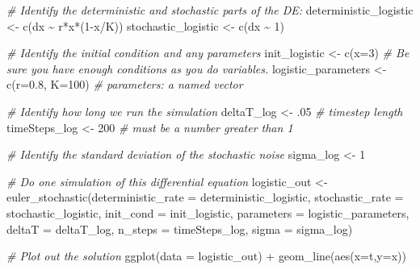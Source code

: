 \documentclass[
]{book}
\newenvironment{Shaded}{\begin{snugshade}}{\end{snugshade}}
\newcommand{\AttributeTok}[1]{\textcolor[rgb]{0.77,0.63,0.00}{#1}}
\newcommand{\CommentTok}[1]{\textcolor[rgb]{0.56,0.35,0.01}{\textit{#1}}}
\newcommand{\DecValTok}[1]{\textcolor[rgb]{0.00,0.00,0.81}{#1}}
\newcommand{\FloatTok}[1]{\textcolor[rgb]{0.00,0.00,0.81}{#1}}
\newcommand{\FunctionTok}[1]{\textcolor[rgb]{0.00,0.00,0.00}{#1}}
\newcommand{\NormalTok}[1]{#1}
\newcommand{\OtherTok}[1]{\textcolor[rgb]{0.56,0.35,0.01}{#1}}
\newcommand{\SpecialCharTok}[1]{\textcolor[rgb]{0.00,0.00,0.00}{#1}}
\theoremstyle{definition}
\theoremstyle{definition}
\theoremstyle{definition}
\theoremstyle{remark}
\begin{document}
\begin{Shaded}
\begin{Highlighting}[]
\CommentTok{\# Identify the deterministic and stochastic parts of the DE:}
\NormalTok{deterministic\_logistic }\OtherTok{\textless{}{-}} \FunctionTok{c}\NormalTok{(dx }\SpecialCharTok{\textasciitilde{}}\NormalTok{ r}\SpecialCharTok{*}\NormalTok{x}\SpecialCharTok{*}\NormalTok{(}\DecValTok{1}\SpecialCharTok{{-}}\NormalTok{x}\SpecialCharTok{/}\NormalTok{K))}
\NormalTok{stochastic\_logistic }\OtherTok{\textless{}{-}}  \FunctionTok{c}\NormalTok{(dx }\SpecialCharTok{\textasciitilde{}} \DecValTok{1}\NormalTok{)}

\CommentTok{\# Identify the initial condition and any parameters}
\NormalTok{init\_logistic }\OtherTok{\textless{}{-}} \FunctionTok{c}\NormalTok{(}\AttributeTok{x=}\DecValTok{3}\NormalTok{)  }\CommentTok{\# Be sure you have enough conditions as you do variables. }
\NormalTok{logistic\_parameters }\OtherTok{\textless{}{-}} \FunctionTok{c}\NormalTok{(}\AttributeTok{r=}\FloatTok{0.8}\NormalTok{, }\AttributeTok{K=}\DecValTok{100}\NormalTok{)   }\CommentTok{\# parameters: a named vector}

\CommentTok{\# Identify how long we run the simulation}
\NormalTok{deltaT\_log }\OtherTok{\textless{}{-}}\NormalTok{ .}\DecValTok{05}    \CommentTok{\# timestep length}
\NormalTok{timeSteps\_log }\OtherTok{\textless{}{-}} \DecValTok{200}   \CommentTok{\# must be a number greater than 1}

\CommentTok{\# Identify the standard deviation of the stochastic noise}
\NormalTok{sigma\_log }\OtherTok{\textless{}{-}} \DecValTok{1}

\CommentTok{\# Do one simulation of this differential equation}
\NormalTok{logistic\_out }\OtherTok{\textless{}{-}} \FunctionTok{euler\_stochastic}\NormalTok{(}\AttributeTok{deterministic\_rate =}\NormalTok{ deterministic\_logistic,}
                             \AttributeTok{stochastic\_rate =}\NormalTok{ stochastic\_logistic,}
                             \AttributeTok{init\_cond =}\NormalTok{ init\_logistic,}
                             \AttributeTok{parameters =}\NormalTok{ logistic\_parameters,}
                             \AttributeTok{deltaT =}\NormalTok{ deltaT\_log,}
                             \AttributeTok{n\_steps =}\NormalTok{ timeSteps\_log,}
                             \AttributeTok{sigma =}\NormalTok{ sigma\_log)}

\CommentTok{\# Plot out the solution}
\FunctionTok{ggplot}\NormalTok{(}\AttributeTok{data =}\NormalTok{ logistic\_out) }\SpecialCharTok{+}
  \FunctionTok{geom\_line}\NormalTok{(}\FunctionTok{aes}\NormalTok{(}\AttributeTok{x=}\NormalTok{t,}\AttributeTok{y=}\NormalTok{x))}
\end{Highlighting}
\end{Shaded}
\end{document}
